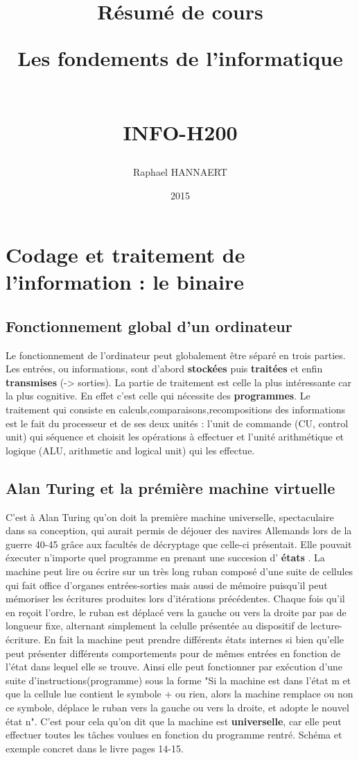 \documentclass{report}
\title{Résumé de cours \\
	\vspace{10pt} \begin{Huge} \begin{bf} \og Les fondements de l'informatique \fg \end{bf} \end{Huge} \\
	INFO-H200 }
\date{\vspace{100pt}  2015 }
\author{Raphael HANNAERT }
\begin{document}
\maketitle

\tableofcontents
\newpage

\chapter{Codage et traitement de l'information : le binaire}

\section{Fonctionnement global d'un ordinateur}

Le fonctionnement de l'ordinateur peut globalement être séparé en trois parties.
Les entrées, ou informations, sont d'abord {\bf stockées} puis {\bf traitées} et enfin {\bf transmises} (-> sorties).
La partie de traitement est celle la plus intéressante car la plus cognitive. En effet c'est celle qui nécessite des {\bf programmes}. Le traitement qui consiste en calculs,comparaisons,recompositions des informations est le fait du processeur et de ses deux unités : l'unit de commande (CU, control unit) qui séquence et choisit les opérations à effectuer et l'unité arithmétique et logique (ALU, arithmetic and logical unit) qui les effectue.

\section{Alan Turing et la prémière machine virtuelle}
C'est à Alan Turing qu'on doit la première machine universelle, spectaculaire dans sa conception, qui aurait permis de déjouer des navires Allemands lors de la guerre 40-45 grâce aux facultés de décryptage que celle-ci présentait.
Elle pouvait éxecuter n'importe quel programme en prenant une succesion d' {\bf états }. La machine peut lire ou écrire sur un très long ruban composé d'une suite de cellules qui fait office d'organes entrées-sorties mais aussi de mémoire puisqu'il peut mémoriser les écritures produites lors d'itérations précédentes. Chaque fois qu'il en reçoit l'ordre, le ruban est déplacé vers la gauche ou vers la droite par pas de longueur fixe, alternant simplement la celulle présentée au dispositif de lecture-écriture. En fait la machine peut prendre différents états internes si bien qu'elle peut présenter différents comportements pour de mêmes entrées en fonction de l'état dans lequel elle se trouve. Ainsi elle peut fonctionner par exécution d'une suite d'instructions(programme) sous la forme "Si la machine est dans l'état m et que la cellule lue contient le symbole + ou rien, alors la machine remplace ou non ce symbole, déplace le ruban vers la gauche ou vers la droite, et adopte le nouvel état n". C'est pour cela qu'on dit que la machine est {\bf universelle}, car elle peut effectuer toutes les tâches voulues en fonction du programme rentré. Schéma et exemple concret dans le livre pages 14-15.
\end{document}
